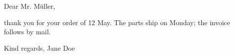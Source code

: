 \documentclass[11pt,a4paper]{article}
\begin{document}
Dear Mr. Müller,

thank you for your order of 12 May. The parts ship on Monday; the invoice follows by mail.

Kind regards, Jane Doe
\end{document}
